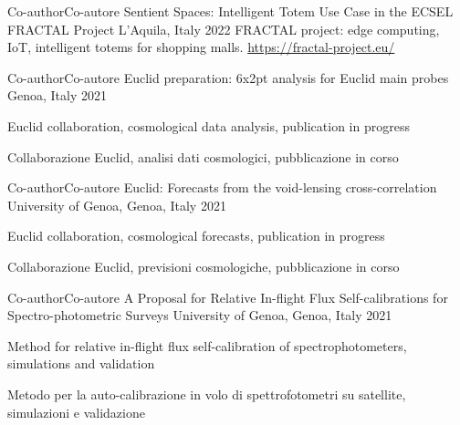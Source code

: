 


\begin{cventries}


\cventry
{
    \ifenglish Co-author\else Co-autore\fi
}
{
    Sentient Spaces: Intelligent Totem Use Case in the ECSEL FRACTAL Project
}
{L'Aquila, Italy}
{2022}
{
    FRACTAL project: edge computing, IoT, intelligent totems for shopping malls. \url{https://fractal-project.eu/}
}


\cventry
{\ifenglish Co-author\else Co-autore\fi} %
{Euclid preparation: 6x2pt analysis for Euclid main probes} %
{Genoa, Italy}
{2021} %
{ %
\begin{cvitems}
  \ifenglish
  \item {Euclid collaboration, cosmological data analysis, publication in progress}
  \else
  \item {Collaborazione Euclid, analisi dati cosmologici, pubblicazione in corso}
  \fi
\end{cvitems}
}


\cventry
{\ifenglish Co-author\else Co-autore\fi} %
{Euclid: Forecasts from the void-lensing cross-correlation} %
{University of Genoa, Genoa, Italy}
{2021} %
{ %
\begin{cvitems}
  \ifenglish
  \item {Euclid collaboration, cosmological forecasts, publication in progress}
  \else
  \item {Collaborazione Euclid, previsioni cosmologiche, pubblicazione in corso}
  \fi
\end{cvitems}
}
\cventry
{\ifenglish Co-author\else Co-autore\fi} %
{A Proposal for Relative In-flight Flux Self-calibrations for Spectro-photometric Surveys} %
{University of Genoa, Genoa, Italy}
{2021} %
{
\begin{cvitems}
  \ifenglish
  \item {Method for relative in-flight flux self-calibration of spectrophotometers, simulations and validation}
  \else
  \item {Metodo per la auto-calibrazione in volo di spettrofotometri su satellite, simulazioni e validazione}
  \fi
\end{cvitems}
}

\end{cventries}